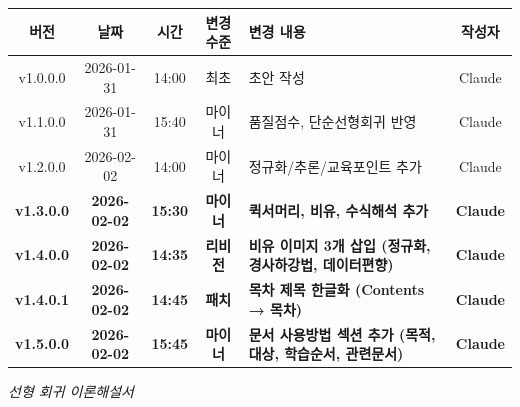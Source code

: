 \documentclass[11pt,a4paper]{article}
\begin{document}
\begin{center}
\renewcommand{\arraystretch}{1.3}
\begin{tabular}{|c|c|c|c|p{4.5cm}|c|}
\hline
\rowcolor{tableheader}
\textbf{버전} & \textbf{날짜} & \textbf{시간} & \textbf{변경 수준} & \textbf{변경 내용} & \textbf{작성자} \\
\hline
v1.0.0.0 & 2026-01-31 & 14:00 & 최초 & 초안 작성 & Claude \\
\hline
v1.1.0.0 & 2026-01-31 & 15:40 & 마이너 & 품질점수, 단순선형회귀 반영 & Claude \\
\hline
v1.2.0.0 & 2026-02-02 & 14:00 & 마이너 & 정규화/추론/교육포인트 추가 & Claude \\
\hline
\textbf{v1.3.0.0} & \textbf{2026-02-02} & \textbf{15:30} & \textbf{마이너} & \textbf{퀵서머리, 비유, 수식해석 추가} & \textbf{Claude} \\
\hline
\textbf{v1.4.0.0} & \textbf{2026-02-02} & \textbf{14:35} & \textbf{리비전} & \textbf{비유 이미지 3개 삽입 (정규화, 경사하강법, 데이터편향)} & \textbf{Claude} \\
\hline
\textbf{v1.4.0.1} & \textbf{2026-02-02} & \textbf{14:45} & \textbf{패치} & \textbf{목차 제목 한글화 (Contents → 목차)} & \textbf{Claude} \\
\hline
\textbf{v1.5.0.0} & \textbf{2026-02-02} & \textbf{15:45} & \textbf{마이너} & \textbf{문서 사용방법 섹션 추가 (목적, 대상, 학습순서, 관련문서)} & \textbf{Claude} \\
\hline
\end{tabular}
\end{center}

\vspace{2cm}

\begin{center}
\textit{\color{lightbrown} 선형 회귀 이론해설서}
\end{center}
\end{document}
